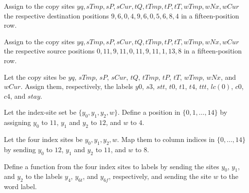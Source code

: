 \begin{definition}
\label{Complexity.LogProg.cpDst}
\leanok
{}
Assign to the copy sites $yq,sTmp,sP,sCur,tQ,tTmp,tP,tT,wTmp,wNx,wCur$ the respective
destination positions $9,6,0,4,9,6,0,5,6,8,4$ in a fifteen-position row.
\end{definition}

\begin{definition}
\label{Complexity.LogProg.cpSrc}
\leanok
{}
Assign to the copy sites $yq,sTmp,sP,sCur,tQ,tTmp,tP,tT,wTmp,wNx,wCur$ the respective
source positions $0,11,9,11,0,11,9,11,1,13,8$ in a fifteen-position row.
\end{definition}

\begin{definition}
\label{Complexity.LogProg.cpEx}
\leanok
{}
Let the copy sites be $yq$, $sTmp$, $sP$, $sCur$, $tQ$, $tTmp$, $tP$, $tT$, $wTmp$,
$wNx$, and $wCur$. Assign them, respectively, the labels $y0$, $s3$, $stt$, $t0$, $t1$,
$t4$, $ttt$, $lc(0)$, $c0$, $c4$, and $stay$.
\end{definition}

\begin{definition}
\label{Complexity.LogProg.ixRow}
\leanok
{}
Let the index-site set be $\{y_0,y_1,y_2,w\}$. Define a position in
$\{0,1,\ldots,14\}$ by assigning $y_0$ to $11$, $y_1$ and $y_2$ to $12$, and $w$ to
$4$.
\end{definition}

\begin{definition}
\label{Complexity.LogProg.ixCol}
\leanok
{}
Let the four index sites be $y_0,y_1,y_2,w$. Map them to column indices in
$\{0,\ldots,14\}$ by sending $y_0$ to $12$, $y_1$ and $y_2$ to $11$, and $w$ to
$8$.
\end{definition}

\begin{definition}
\label{Complexity.LogProg.ixEx}
\leanok
{}
Define a function from the four index sites to labels by sending the sites $y_0$, $y_1$,
and $y_2$ to the labels $y_4$, $y_{6t}$, and $y_{6f}$, respectively, and sending the
site $w$ to the word label.
\end{definition}

